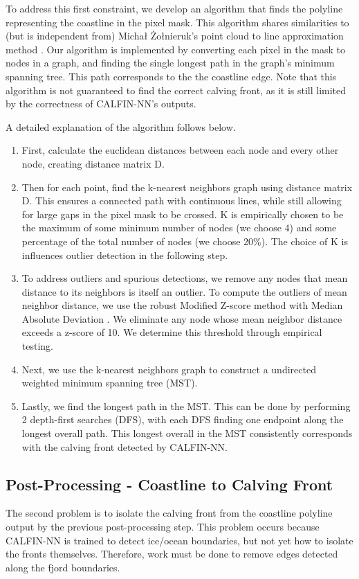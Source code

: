 \documentclass[tc, manuscript]{copernicus}
\begin{document}
To address this first constraint, we develop an algorithm that finds the polyline representing the coastline in the pixel mask. This algorithm shares similarities to (but is independent from) Michał Żołnieruk's point cloud to line approximation method \citep{zolnieruk2016}. Our algorithm is implemented by converting each pixel in the mask to nodes in a graph, and finding the single longest path in the graph's minimum spanning tree. This path corresponds to the the coastline edge. Note that this algorithm is not guaranteed to find the correct calving front, as it is still limited by the correctness of CALFIN-NN's outputs.

A detailed explanation of the algorithm follows below.


\begin{enumerate}
    \item First, calculate the euclidean distances between each node and every other node, creating distance matrix D.
    \item Then for each point, find the k-nearest neighbors graph using distance matrix D. This ensures a connected path with continuous lines, while still allowing for large gaps in the pixel mask to be crossed. K is empirically chosen to be the maximum of some minimum number of nodes (we choose 4) and some percentage of the total number of nodes (we choose 20\%). The choice of K is influences outlier detection in the following step. 
    \item To address outliers and spurious detections, we remove any nodes that mean distance to its neighbors is itself an outlier. To compute the outliers of mean neighbor distance, we use the robust Modified Z-score method with Median Absolute Deviation \citep{garcia2012}. We eliminate any node whose mean neighbor distance exceeds a z-score of 10. We determine this threshold through empirical testing. 
    \item Next, we use the k-nearest neighbors graph to construct a undirected weighted minimum spanning tree (MST).
    \item Lastly, we find the longest path in the MST. This can be done by performing 2 depth-first searches (DFS), with each DFS finding one endpoint along the longest overall path. This longest overall in the MST consistently corresponds with the calving front detected by CALFIN-NN.
\end{enumerate}

\subsection{Post-Processing - Coastline to Calving Front}
The second problem is to isolate the calving front from the coastline polyline output by the previous post-processing step. This problem occurs because CALFIN-NN is trained to detect ice/ocean boundaries, but not yet how to isolate the fronts themselves. Therefore, work must be done to remove edges detected along the fjord boundaries.
\end{document}
